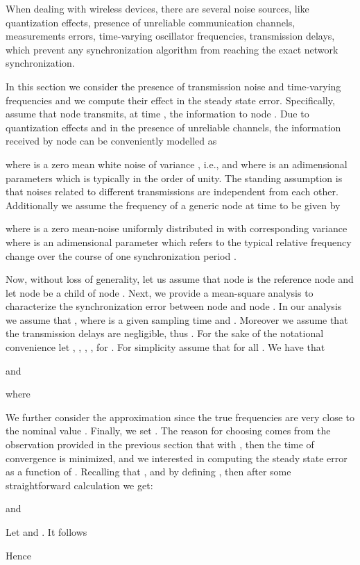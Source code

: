 \documentclass[english,a4paper,10pt,final]{article}
\numberwithin{equation}{section}
\numberwithin{figure}{section}
\begin{document}
When dealing with wireless devices, there are several noise sources, like quantization effects, presence of unreliable communication channels, measurements errors, time-varying oscillator frequencies, transmission delays, which prevent any synchronization algorithm from reaching the exact network synchronization. 

In this section we consider the presence of transmission noise and time-varying frequencies and we compute their effect in the steady state error. Specifically, assume that node  transmits, at time , the information  to node . Due to quantization effects and in the presence of unreliable channels, 
the information received by node  can be conveniently modelled as

where  is a zero mean white noise of variance , i.e., and 
where  is an adimensional parameters which is typically in the order of unity.
The standing assumption is that noises related to different transmissions are independent from each other.  Additionally we assume the frequency of a generic node  at time  to be given by 

where  is a zero mean-noise uniformly distributed in  with corresponding variance 
where  is an adimensional parameter which refers to the typical relative frequency change over the course of one synchronization period .


Now, without loss of generality, let us assume that node  is the reference node and let node  be a child of node . Next, we provide a mean-square analysis to characterize the synchronization error between node  and node . 
In our analysis we assume that , where  is a given sampling time and . Moreover we assume that the transmission delays are negligible, thus . For the sake of the notational convenience let , , , , for . For simplicity assume that  for all . We have that

and 

where

We further consider the approximation  since the true frequencies are very close to the nominal value . Finally, we set . The reason for choosing  comes from the observation provided in the previous section that with , then the time of convergence is minimized, and we interested in computing the steady state error as a function of .
Recalling that , and by defining , then after some straightforward calculation we get: 


and

Let  and . It follows

Hence
\end{document}
